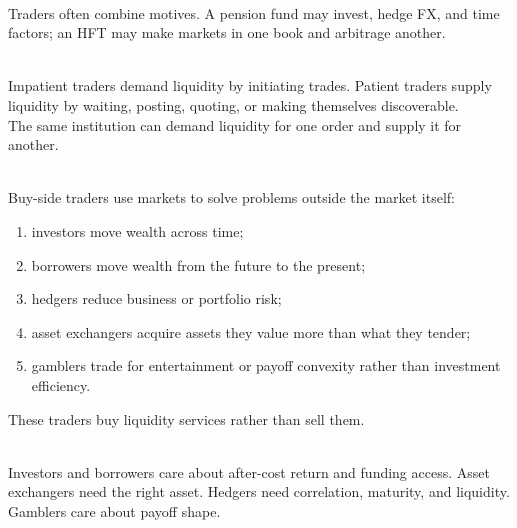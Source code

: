 \documentclass[a4paper,oneside,openany]{book}
\begin{document}
\begin{caveat} \\
Traders often combine motives. A pension fund may invest, hedge FX, and time factors; an HFT may make markets in one book and arbitrage another.
\end{caveat}

\begin{principle} \\
Impatient traders demand liquidity by initiating trades. Patient traders supply liquidity by waiting, posting, quoting, or making themselves discoverable.\\
The same institution can demand liquidity for one order and supply it for another.
\end{principle}

\begin{taxonomy} \\
Buy-side traders use markets to solve problems outside the market itself:
\begin{enumerate}[label=\roman*.]
\setlength{\itemsep}{0pt}
\item investors move wealth across time;
\item borrowers move wealth from the future to the present;
\item hedgers reduce business or portfolio risk;
\item asset exchangers acquire assets they value more than what they tender;
\item gamblers trade for entertainment or payoff convexity rather than investment efficiency.
\end{enumerate}
These traders buy liquidity services rather than sell them.
\end{taxonomy}

\begin{principle} \\
Investors and borrowers care about after-cost return and funding access. Asset exchangers need the right asset. Hedgers need correlation, maturity, and liquidity. Gamblers care about payoff shape.
\end{principle}
\end{document}
